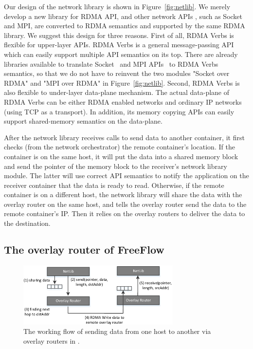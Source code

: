 Our design of the network library is shown in Figure~\ref{fig:netlib}. 
We merely develop a new library for RDMA API, and other network APIs
, such as Socket and MPI, are converted to RDMA semantics and supported
by the same RDMA library. We suggest this design for three reasons. 
First of all, RDMA Verbs is flexible for upper-layer APIs.
RDMA Verbs is a general message-passing API which can 
easily support multiple API semantics on its top. There are already libraries
available to translate Socket~\cite{rfc7609,rsockets,sdp} and MPI APIs~ \cite{mpi-rdma} to RDMA Verbs 
semantics, so that we do not have to reinvent the two modules "Socket over RDMA" and "MPI over RDMA" in Figure~\ref{fig:netlib}.
Second, RDMA Verbs is also flexible to under-layer data-plane mechanism. 
The actual data-plane of RDMA Verbs can be either RDMA enabled networks and 
ordinary IP networks (using TCP as a transport). 
In addition, its memory copying APIs can 
easily support shared-memory semantics on the data-plane. 

After the network library receives calls to send data to another
container, it first checks (from the network orchestrator) the remote container's
location. If the container is on the same host, it will put the data into
a shared memory block and send the pointer of the memory block to the receiver's
network library module. The latter will use correct API semantics to notify the application on the receiver container that the data is ready to read.
Otherwise, if the remote container is on a different host, the network library will share the data with the overlay router on the same host, and tells the overlay router send the data to the remote container's IP. Then it relies on 
the overlay routers to deliver the data to the destination. 

\subsection{The overlay router of FreeFlow}

\begin{figure}[t!] 
     \centering 
     \includegraphics[width=3.2in]{figures/overlayrouter.pdf} 
    \caption{\label{fig:overlayrouter} The working flow of sending data from one host to another via overlay routers in \sysname.} 
\end{figure} 

